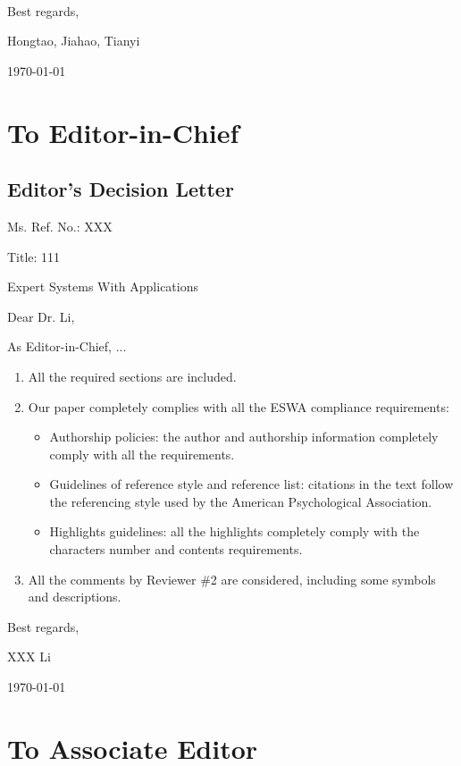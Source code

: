 \documentclass[12pt, review, authoryear]{elsarticle}
\def\mycoauthor{Hongtao, Jiahao, Tianyi}
\def\mydate{\today} %
\begin{document}
~\\
\noindent Best regards,

\noindent \mycoauthor

\noindent \mydate


\tableofcontents
\newpage

\section{To Editor-in-Chief}


\subsection{Editor’s Decision Letter}

Ms. Ref. No.: XXX

Title: 111

Expert Systems With Applications

Dear Dr. Li,

As Editor-in-Chief, ...

\begin{enumerate}
  \item All the required sections are included.
  \item Our paper completely complies with all the ESWA compliance requirements:
        \begin{itemize}
          \item Authorship policies: the author and authorship information completely comply with all the requirements.
          \item Guidelines of reference style and reference list: citations in the text follow the referencing style used by the American Psychological Association.
          \item Highlights guidelines: all the highlights completely comply with the characters  number and contents requirements.
        \end{itemize}
  \item All the comments by Reviewer \#2 are considered, including some symbols and descriptions.
\end{enumerate}

\noindent Best regards,

\noindent XXX Li

\noindent \mydate

\section{To Associate Editor}
\end{document}
